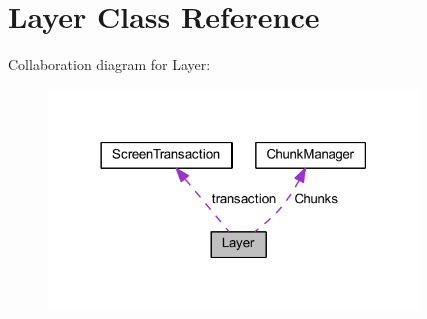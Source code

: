 \hypertarget{class_layer}{\section{Layer Class Reference}
\label{class_layer}
}


Collaboration diagram for Layer\-:\nopagebreak
\begin{figure}[H]
\begin{center}
\leavevmode
\includegraphics[width=278pt]{class_layer__coll__graph}
\end{center}
\end{figure}
